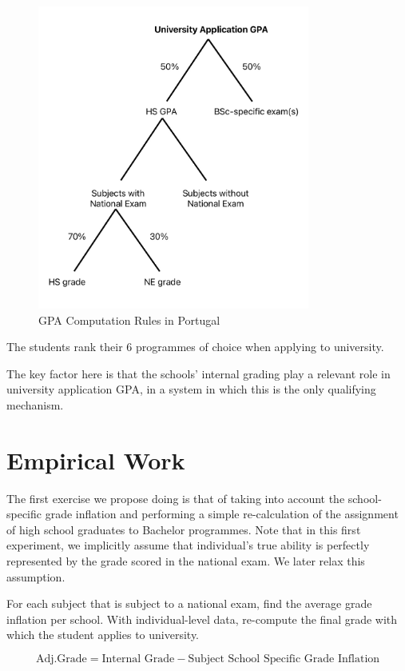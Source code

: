 \documentclass{article}
\begin{document}
\begin{figure}[ht]
  \centering
  \includegraphics[height=10cm, keepaspectratio]{Figures/GradeComputationPortugal.jpeg}
  \caption{GPA Computation Rules in Portugal}
  \label{fig: GradeComputationPortugal}
\end{figure}


The students rank their 6 programmes of choice when applying to university.

The key factor here is that the schools' internal grading play a relevant role in university application GPA, in a system in which this is the only qualifying mechanism.

\section{Empirical Work}

The first exercise we propose doing is that of taking into account the school-specific grade inflation and performing a simple re-calculation of the assignment of high school graduates to Bachelor programmes. Note that in this first experiment, we implicitly assume that individual's true ability is perfectly represented by the grade scored in the national exam. 
We later relax this assumption. %

For each subject that is subject to a national exam, find the average grade inflation per school. With individual-level data, re-compute the final grade with which the student applies to university.  

\[
\text{Adj.Grade} = \text{Internal Grade} - \text{Subject School Specific Grade Inflation}
\]  
\end{document}
